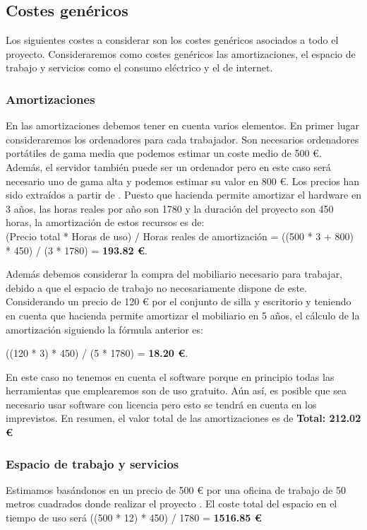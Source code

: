 \subsection{Costes genéricos}
Los siguientes costes a considerar son los costes genéricos asociados a todo el proyecto. Consideraremos como costes genéricos las amortizaciones, el espacio de trabajo y servicios como el consumo eléctrico y el de internet.

\subsubsection*{Amortizaciones}
En las amortizaciones debemos tener en cuenta varios elementos. En primer lugar consideraremos los ordenadores para cada trabajador. Son necesarios ordenadores portátiles de gama media que podemos estimar un coste medio de 500 €. Además, el servidor también puede ser un ordenador pero en este caso será necesario uno de gama alta y podemos estimar su valor en 800 €. Los precios han sido extraídos a partir de \cite{mediamark}. Puesto que hacienda permite amortizar el hardware en 3 años, las horas reales por año son 1780 y la duración del proyecto son 450 horas, la amortización de estos recursos es de: \\

(Precio total * Horas de uso) / Horas reales de amortización = ((500 * 3 + 800) * 450) / (3 * 1780) = \textbf{193.82 €}.  

Además debemos considerar la compra del mobiliario necesario para trabajar, debido a que el espacio de trabajo no necesariamente dispone de este. Considerando un precio de 120 € por el conjunto de silla y escritorio \cite{ikea} y teniendo en cuenta que hacienda permite amortizar el mobiliario en 5 años, el cálculo de la amortización siguiendo la fórmula anterior es:  

((120 * 3) * 450) / (5 * 1780) = \textbf{18.20 €}. 

En este caso no tenemos en cuenta el software porque en principio todas las herramientas que emplearemos son de uso gratuito. Aún así, es posible que sea necesario usar software con licencia pero esto se tendrá en cuenta en los imprevistos. En resumen, el valor total de las amortizaciones es de \textbf{Total: 212.02 €}

\subsubsection*{Espacio de trabajo y servicios}
Estimamos basándonos en \cite{oficinas} un precio de 500 € por una oficina de trabajo de 50 metros cuadrados donde realizar el proyecto . El coste total del espacio en el tiempo de uso será ((500 * 12) * 450) / 1780 = \textbf{1516.85 €}  

